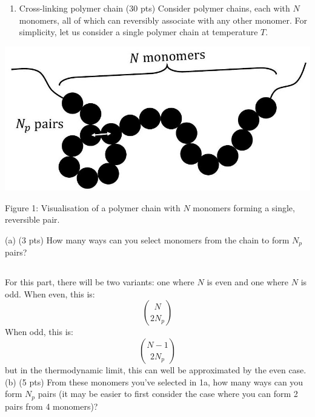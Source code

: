 \documentclass[12pt]{article}
\begin{document}
\section{}
\begin{enumerate}
  \item Cross-linking polymer chain (30 pts) Consider polymer chains, each with $N$ monomers, all of which can reversibly associate with any other monomer. For simplicity, let us consider a single polymer chain at temperature $T$.
\end{enumerate}

\begin{center}
\includegraphics[max width=\textwidth]{2024_02_03_75704bce2caff28cbfb1g-2}
\end{center}

Figure 1: Visualisation of a polymer chain with $N$ monomers forming a single, reversible pair.

(a) (3 pts) How many ways can you select monomers from the chain to form $N_{p}$ pairs?
\subsection{}
 For this part, there will be two variants: one where $N$ is even and one where $N$ is odd. When even, this is:
\begin{equation}
  \binom{N}{2N_p}
\end{equation} 
When odd, this is:
\begin{equation}
  \binom{N-1}{2N_p}
\end{equation}
but in the thermodynamic limit, this can well be approximated by the even case.\\
(b) (5 pts) From these monomers you've selected in 1a, how many ways can you form $N_{p}$ pairs (it may be easier to first consider the case where you can form 2 pairs from 4 monomers)?
\end{document}

